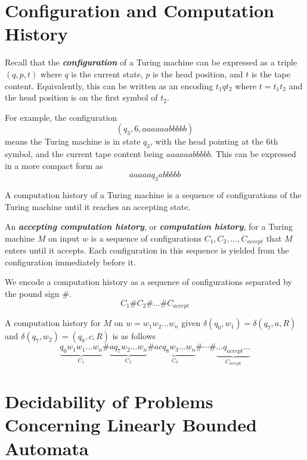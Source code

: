 \section{Configuration and Computation History}

Recall that the \textit{\textbf{configuration}} of a Turing machine can be expressed as a triple $(q,p,t)$ where $q$ is the current state, $p$ is the head position, and $t$ is the tape content. Equivalently, this can be written as an encoding $t_1qt_2$ where $t = t_1t_2$ and the head position is on the first symbol of $t_2$.

\begin{example}
    For example, the configuration 
    $$(q_3,6,aaaaaabbbbb)$$
    means the Turing machine is in state $q_3$, with the head pointing at the 6th symbol, and the current tape content being $aaaaaabbbbb$. This can be expressed in a more compact form as
    $$
    aaaaa q_3 abbbbb
    $$
\end{example}

A computation history of a Turing machine is a sequence of configurations of the Turing machine until it reaches an accepting state.

\begin{definition}
    An \textit{\textbf{accepting computation history}}, or \textit{\textbf{computation history}}, for a Turing machine $M$ on input $w$ is a sequence of configurations $C_1,C_2,\ldots,C_{accept}$ that $M$ enters until it accepts. Each configuration in this sequence is yielded from the configuration immediately before it.
    
    We encode a computation history as a sequence of configurations separated by the pound sign \#.
    $$
    C_1 \# C_2 \# \ldots \# C_{accept}
    $$
\end{definition}

\begin{example}
    A computation history for $M$ on $w = w_1w_2\ldots w_n$ given $\delta(q_0,w_1) = \delta(q_7,a,R)$ and $\delta(q_7,w_2) = (q_8,c,R)$ is as follows
    $$
    \underbrace{q_0w_1w_1 \ldots w_n}_{C_1} \# \underbrace{aq_7w_2 \ldots w_n}_{C_2} \# \underbrace{acq_8w_3 \ldots w_n}_{C_3} \# \cdots \# \underbrace{\ldots q_{accept} \ldots}_{C_{accept}}
    $$
\end{example}

\section{Decidability of Problems Concerning Linearly Bounded Automata}

